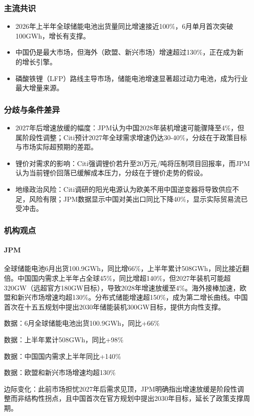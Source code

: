 \documentclass[11pt]{ctexart}
\begin{document}
\subsubsection*{主流共识}
\begin{itemize}
  \item 2026年上半年全球储能电池出货量同比增速接近100\%，6月单月首次突破100GWh，增长有支撑。
  \item 中国仍是最大市场，但海外（欧盟、新兴市场）增速超过130\%，正在成为新的增长引擎。
  \item 磷酸铁锂（LFP）路线主导市场，储能电池增速显著超过动力电池，成为行业最大增量来源。
\end{itemize}
\subsubsection*{分歧与条件差异}
\begin{itemize}
  \item 2027年后增速放缓的幅度：JPM认为中国2028年装机增速可能骤降至4\%，但属阶段性调整；Citi预计2027年全球需求增速仍达30-40\%，分歧在于政策目标与市场实际超预期的差距。
  \item 锂价对需求的影响：Citi强调锂价若升至20万元/吨将压制项目回报率，而JPM认为当前锂价回落已缓解成本压力，分歧在于锂价走势的假设。
  \item 地缘政治风险：Citi调研的阳光电源认为欧美不用中国逆变器将导致供应不足，风险有限；JPM数据显示中国对美出口同比下降40\%，显示实际贸易流已受冲击。
\end{itemize}
\subsubsection*{机构观点}
\paragraph{JPM} 全球储能电池6月出货100.9GWh，同比增66\%，上半年累计508GWh，同比接近翻倍。中国国内需求上半年占全球45\%，同比增超140\%，但2027年装机可能超320GW（远超官方180GW目标），导致2028年增速放缓至4\%。海外接棒加速，欧盟和新兴市场增速均超130\%。分布式储能增速超150\%，成为第二增长曲线。中国首次在十五五规划中提出2030年储能装机300GW目标，提供方向性支撑。
{\small\color{refgray}数据：6月全球储能电池出货100.9GWh，同比+66\%\par}
{\small\color{refgray}数据：上半年累计508GWh，同比+98\%\par}
{\small\color{refgray}数据：中国国内需求上半年同比+140\%\par}
{\small\color{refgray}数据：欧盟和新兴市场增速均超130\%\par}
{\small\color{refgray}边际变化：此前市场担忧2027年后需求见顶，JPM明确指出增速放缓是阶段性调整而非结构性拐点，且中国首次在官方规划中提出2030年目标，延长了政策支撑周期。\par}
\end{document}
